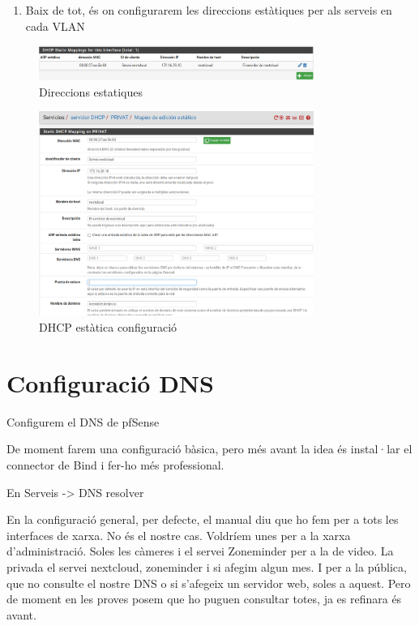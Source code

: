 \documentclass[
  10pt,
]{krantz}
\providecommand{\tightlist}{%
  \setlength{\itemsep}{0pt}\setlength{\parskip}{0pt}}
\begin{document}
\begin{enumerate}
\def\labelenumi{\arabic{enumi}.}
\setcounter{enumi}{3}
\tightlist
\item
  Baix de tot, és on configurarem les direccions estàtiques per als serveis en cada VLAN
\end{enumerate}

\begin{figure}
\centering
\includegraphics[width=0.8\textwidth,height=\textheight]{imatges/proxmox/dhcp_estatic.png}
\caption{Direccions estatiques}
\end{figure}

\begin{figure}
\centering
\includegraphics[width=0.8\textwidth,height=\textheight]{imatges/proxmox/dhcp_estatic1.png}
\caption{DHCP estàtica configuració}
\end{figure}

\hypertarget{configuraciuxf3-dns}{%
\section{Configuració DNS}\label{configuraciuxf3-dns}}

Configurem el DNS de pfSense

De moment farem una configuració bàsica, pero més avant la idea és instal·lar el connector de Bind i fer-ho més professional.

En Serveis -\textgreater{} DNS resolver

En la configuració general, per defecte, el manual diu que ho fem per a tots les interfaces de xarxa. No és el nostre cas. Voldríem unes per a la xarxa d'administració. Soles les càmeres i el servei Zoneminder per a la de video. La privada el servei nextcloud, zoneminder i si afegim algun mes. I per a la pública, que no consulte el nostre DNS o si s'afegeix un servidor web, soles a aquest. Pero de moment en les proves posem que ho puguen consultar totes, ja es refinara és avant.
\end{document}
